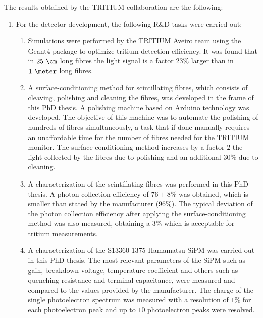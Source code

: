 The results obtained by the TRITIUM collaboration are the following:

\begin{enumerate}
\item{} For the detector development, the following R$\&$D tasks were carried out:

\begin{enumerate}
\item{} Simulations were performed by the TRITIUM Aveiro team using the Geant4 package to optimize tritium detection efficiency. It was found that in $25~\cm$ long fibres the light signal is a factor $23\%$ larger than in $1~\meter$ long fibres. %

\item{} A surface-conditioning method for scintillating fibres, which consists of cleaving, polishing and cleaning the fibres, was developed in the frame of this PhD thesis. A polishing machine based on Arduino technology was developed. The objective of this machine was to automate the polishing of hundreds of fibres simultaneously, a task that if done manually requires an unaffordable time for the number of fibres needed for the TRITIUM monitor. The surface-conditioning method increases by a factor $2$ the light collected by the fibres due to polishing and an additional $30\%$ due to cleaning. 

\item{} A characterization of the scintillating fibres was performed in this PhD thesis. A photon collection efficiency of $76\pm 8\%$ was obtained, which is smaller than stated by the manufacturer ($96\%$). The typical deviation of the photon collection efficiency after applying the surface-conditioning method was also measured, obtaining a $3\%$ which is acceptable for tritium measurements.

\item{} A characterization of the S13360-1375 Hamamatsu SiPM was carried out in this PhD thesis. The most relevant parameters of the SiPM such as gain, breakdown voltage, temperature coefficient and others such as quenching resistance and terminal capacitance, were measured and compared to the values provided by the manufacturer. The charge of the single photoelectron spectrum was measured with a resolution of $1\%$ for each photoelectron peak and up to $10$ photoelectron peaks were resolved. %


\end{enumerate}
\end{enumerate}
